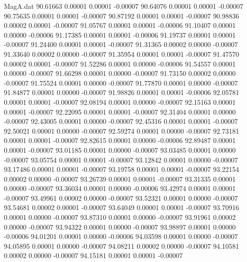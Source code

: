\begin{filecontents}{MagA.dat}
  90.61663    0.00001    0.00001   -0.00007
  90.64076    0.00001    0.00001   -0.00007
  90.75635    0.00001    0.00001   -0.00007
  90.87192    0.00001    0.00001   -0.00007
  90.98836    0.00002    0.00001   -0.00007
  91.05767    0.00001    0.00001   -0.00006
  91.10407    0.00001    0.00000   -0.00006
  91.17385    0.00001    0.00001   -0.00006
  91.19737    0.00001    0.00001   -0.00007
  91.24400    0.00001    0.00001   -0.00007
  91.31365    0.00002    0.00000   -0.00007
  91.33640    0.00002    0.00000   -0.00007
  91.35954    0.00001    0.00001   -0.00007
  91.47570    0.00002    0.00001   -0.00007
  91.52286    0.00001    0.00000   -0.00006
  91.54557    0.00001    0.00000   -0.00007
  91.66298    0.00001    0.00000   -0.00007
  91.73150    0.00002    0.00000   -0.00007
  91.75524    0.00001    0.00000   -0.00007
  91.77870    0.00001    0.00000   -0.00007
  91.84877    0.00001    0.00000   -0.00007
  91.98826    0.00001    0.00001   -0.00006
  92.05781    0.00001    0.00001   -0.00007
  92.08194    0.00001    0.00000   -0.00007
  92.15163    0.00001    0.00001   -0.00007
  92.22095    0.00001    0.00001   -0.00007
  92.31404    0.00001    0.00000   -0.00007
  92.43005    0.00001    0.00000   -0.00007
  92.45316    0.00001    0.00001   -0.00007
  92.50021    0.00001    0.00000   -0.00007
  92.59274    0.00001    0.00000   -0.00007
  92.73181    0.00001    0.00001   -0.00007
  92.82615    0.00001    0.00000   -0.00006
  92.89487    0.00001    0.00001   -0.00007
  93.01185    0.00001    0.00000   -0.00007
  93.03485    0.00001    0.00000   -0.00007
  93.05754    0.00001    0.00001   -0.00007
  93.12842    0.00001    0.00000   -0.00007
  93.17486    0.00001    0.00001   -0.00007
  93.19758    0.00001    0.00001   -0.00007
  93.22154    0.00002    0.00000   -0.00007
  93.26739    0.00001    0.00001   -0.00007
  93.31335    0.00001    0.00000   -0.00007
  93.36034    0.00001    0.00000   -0.00006
  93.42974    0.00001    0.00001   -0.00007
  93.49961    0.00002    0.00000   -0.00007
  93.52321    0.00001    0.00000   -0.00007
  93.54681    0.00002    0.00001   -0.00007
  93.64049    0.00001    0.00001   -0.00007
  93.70916    0.00001    0.00000   -0.00007
  93.87310    0.00001    0.00000   -0.00007
  93.91961    0.00002    0.00000   -0.00007
  93.94322    0.00001    0.00000   -0.00007
  93.98897    0.00001    0.00000   -0.00006
  94.01201    0.00001    0.00000   -0.00006
  94.03598    0.00001    0.00000   -0.00007
  94.05895    0.00001    0.00000   -0.00007
  94.08211    0.00002    0.00000   -0.00007
  94.10581    0.00002    0.00000   -0.00007
  94.15181    0.00001    0.00001   -0.00007

\end{filecontents}
